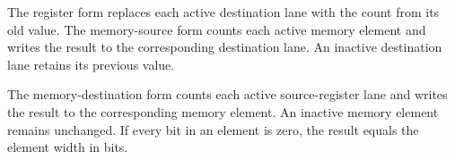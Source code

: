 The register form replaces each active destination lane with the count from its
old value. The memory-source form counts each active memory element and writes
the result to the corresponding destination lane. An inactive destination lane
retains its previous value.

The memory-destination form counts each active source-register lane and writes
the result to the corresponding memory element. An inactive memory element
remains unchanged. If every bit in an element is zero, the result equals the
element width in bits.
